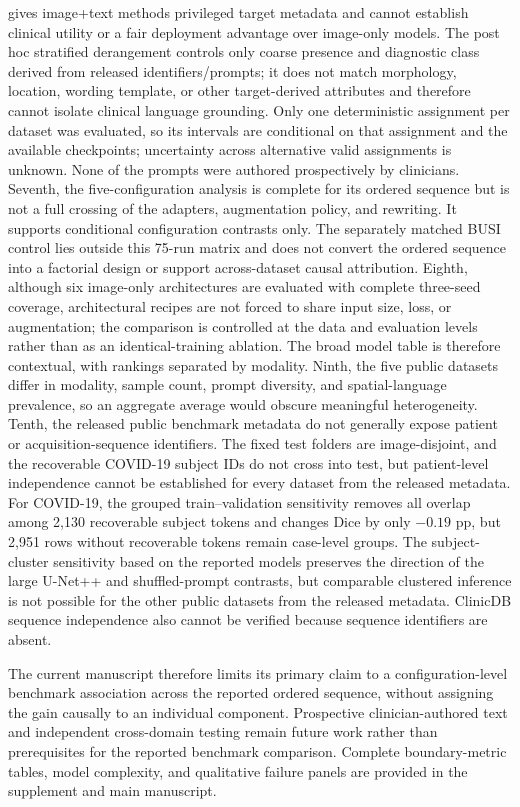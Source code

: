 gives image+text methods privileged target metadata and cannot establish clinical
utility or a fair deployment advantage over image-only models. The post hoc
stratified derangement controls only coarse presence and diagnostic
class derived from released identifiers/prompts; it does not match morphology,
location, wording template, or other target-derived attributes and therefore
cannot isolate clinical language grounding. Only one deterministic assignment
per dataset was evaluated, so its intervals are conditional on that assignment
and the available checkpoints; uncertainty across alternative valid assignments
is unknown. None of the prompts were authored
prospectively by clinicians. Seventh, the five-configuration analysis is complete
for its ordered sequence but is not a full crossing of the adapters, augmentation policy, and
rewriting. It supports conditional configuration contrasts only. The separately
matched BUSI control lies outside this 75-run matrix and does not convert the
ordered sequence into a factorial design or support across-dataset causal
attribution.
Eighth, although six image-only architectures are evaluated with
complete three-seed coverage, architectural recipes are not forced to share input
size, loss, or augmentation; the comparison is controlled at the data and
evaluation levels rather than as an identical-training ablation. The broad model
table is therefore contextual, with rankings separated by modality. Ninth, the
five public datasets differ in modality, sample count, prompt diversity, and
spatial-language prevalence, so an aggregate average would obscure meaningful
heterogeneity. Tenth, the released public benchmark metadata do not generally expose
patient or acquisition-sequence identifiers. The fixed test folders are
image-disjoint, and the recoverable COVID-19 subject IDs do not cross into test,
but patient-level independence cannot be established for every dataset from the
released metadata. For COVID-19, the grouped train--validation sensitivity
removes all overlap among 2,130 recoverable subject tokens and changes
\methodname{} Dice by only $-0.19$ pp, but 2,951 rows without recoverable tokens
remain case-level groups. The subject-cluster sensitivity based on the reported models
preserves the direction of the large U-Net++ and shuffled-prompt contrasts,
but comparable clustered inference is not possible for the other public datasets from the
released metadata. ClinicDB sequence independence also cannot be verified because
sequence identifiers are absent.

The current manuscript therefore limits its primary claim to a
configuration-level benchmark association across the reported ordered
sequence, without assigning the gain causally to an individual component.
Prospective clinician-authored text and independent
cross-domain testing remain future work rather than prerequisites for the
reported benchmark comparison.
Complete boundary-metric tables, model complexity, and qualitative failure
panels are provided in the supplement and main manuscript.

